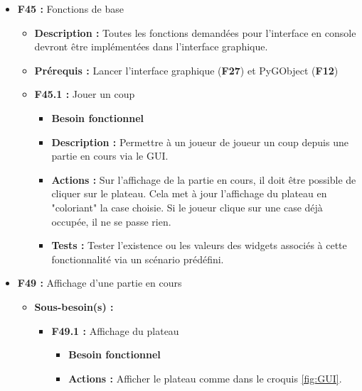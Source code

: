 \documentclass{article}
\begin{document}
\begin{itemize}
\begin{itemize}
        \item \textbf{Actions :} Sur l'affichage du menu principal, ajouter un bouton qui redirige vers une fenêtre affichant les informations voulues, avec la possibilité de revenir vers le menu principal.
        \item \textbf{Tests :} Tester l'existence ou les valeurs des widgets associés à cette fonctionnalité via un scénario prédéfini.
    \end{itemize}
\bigskip
    \item \textbf{F45 :} Fonctions de base
    \begin{itemize}
        \item \textbf{Description :} Toutes les fonctions demandées pour l’interface en console devront être implémentées dans l’interface graphique.
        \item \textbf{Prérequis :} Lancer l’interface graphique (\textbf{F27}) et PyGObject (\textbf{F12})
        \item \textbf{F45.1 :} Jouer un coup
        \begin{itemize}
            \item \textbf{Besoin fonctionnel}
            \item \textbf{Description :} Permettre à un joueur de joueur un coup depuis une partie en cours via le GUI.
            \item \textbf{Actions :} Sur l'affichage de la partie en cours, il doit être possible de cliquer sur le plateau. Cela met à jour l’affichage du plateau en "coloriant" la case choisie. Si le joueur clique sur une case déjà occupée, il ne se passe rien.
            \item \textbf{Tests :} Tester l'existence ou les valeurs des widgets associés à cette fonctionnalité via un scénario prédéfini.
        \end{itemize}
    \end{itemize}
\bigskip
    \item \textbf{F49 :} Affichage d’une partie en cours
    \begin{itemize}
        \item \textbf{Sous-besoin(s) :}
        \begin{itemize}
            \smallskip
            \item \textbf{F49.1 :} Affichage du plateau
            \begin{itemize}
                \item \textbf{Besoin fonctionnel}
                \item \textbf{Actions :} Afficher le plateau comme dans le croquis \ref{fig:GUI}.

\end{itemize}
\end{itemize}
\end{itemize}
\end{itemize}
\end{document}

